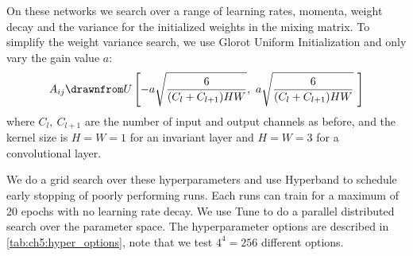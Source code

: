 On these networks we search over a range of learning rates, momenta, weight decay
and the variance for the initialized weights in the mixing matrix. To simplify
the weight variance search, we use Glorot Uniform Initialization 
\cite{glorot_understanding_2010} and only vary the gain value $a$:
%
\begin{equation}
  A_{ij} \drawnfrom U\left[ -a\sqrt{\frac{6}{(C_l + C_{l+1})HW}},\ a\sqrt{\frac{6}{(C_l + C_{l+1})HW}}\
  \right] \label{eq:ch5:glorot}
\end{equation}
%
where $C_l,\ C_{l+1}$ are the number of input and output channels as before, and
the kernel size is $H = W = 1$ for an invariant layer and $H = W= 3$ for a
convolutional layer.

We do a grid search over these hyperparameters and use Hyperband
\cite{li_hyperband:_2016} to schedule early stopping of poorly performing runs.
Each runs can train for a maximum of 20 epochs with no learning rate decay.
We use Tune \cite{liaw2018tune} to do a parallel distributed search over the
parameter space.  
The hyperparameter options are described in
\autoref{tab:ch5:hyper_options}, note that we test $4^4=256$ different options.

